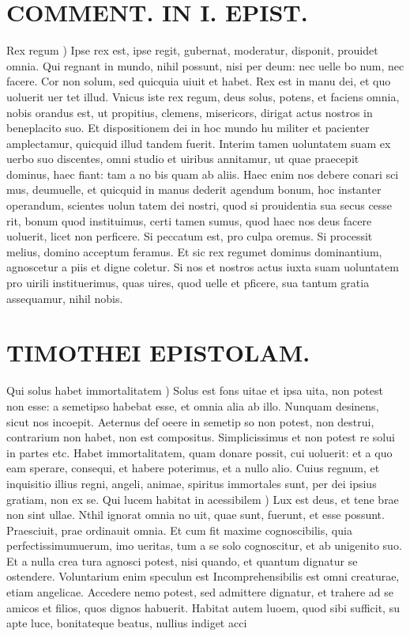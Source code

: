 \documentclass{article}
\begin{document}
\begin{pages}
\section*{COMMENT. IN I. EPIST. }
\marginpar{[ p.176 ]}\pstart Rex regum ) Ipse rex est, ipse regit, gubernat, moderatur, disponit, prouidet omnia. Qui regnant in mundo, nihil possunt, nisi per deum: nec uelle bo num, nec facere. Cor non solum, sed quicquia uiuit et habet. Rex est in manu dei, et quo uoluerit uer tet illud. Vnicus iste rex regum, deus solus, potens, et faciens omnia, nobis orandus est, ut propitius, clemens, misericors, dirigat actus nostros in beneplacito suo. Et dispositionem dei in hoc mundo hu militer et pacienter amplectamur, quicquid illud tandem fuerit. Interim tamen uoluntatem suam ex uerbo suo discentes, omni studio et uiribus annitamur, ut quae praecepit dominus, haec fiant: tam a no bis quam ab aliis. Haec enim nos debere conari sci mus, deumuelle, et quicquid in manus dederit agendum bonum, hoc instanter operandum, scientes uolun tatem dei nostri, quod si prouidentia sua secus cesse rit, bonum quod instituimus, certi tamen sumus, quod haec nos deus facere uoluerit, licet non perficere. Si peccatum est, pro culpa oremus. Si processit melius, domino acceptum feramus. Et sic rex regumet dominus dominantium, agnoscetur a piis et digne coletur. Si nos et nostros actus iuxta suam uoluntatem pro uirili instituerimus, quas uires, quod uelle et pficere, sua tantum gratia assequamur, nihil nobis.  \pend
\section*{TIMOTHEI EPISTOLAM. }
\marginpar{[ p.177 ]}\pstart Qui solus habet immortalitatem ) Solus est fons uitae et ipsa uita, non potest non esse: a semetipso habebat esse, et omnia alia ab illo. Nunquam desinens, sicut nos incoepit. Aeternus def oeere in semetip so non potest, non destrui, contrarium non habet, non est compositus. Simplicissimus et non potest re solui in partes etc. Habet immortalitatem, quam donare possit, cui uoluerit: et a quo eam sperare, consequi, et habere poterimus, et a nullo alio. Cuius regnum, et inquisitio illius regni, angeli, animae, spiritus immortales sunt, per dei ipsius gratiam, non ex se.  \pend\pstart Qui lucem habitat in acessibilem ) Lux est deus, et tene brae non sint ullae. Nthil ignorat omnia no uit, quae sunt, fuerunt, et esse possunt. Praesciuit, prae ordinauit omnia. Et cum fit maxime cognoscibilis, quia perfectissimumuerum, imo ueritas, tum a se solo cognoscitur, et ab unigenito suo. Et a nulla crea tura agnosci potest, nisi quando, et quantum dignatur se ostendere. Voluntarium enim speculun est Incomprehensibilis est omni creaturae, etiam angelicae. Accedere nemo potest, sed admittere dignatur, et trahere ad se amicos et filios, quos dignos habuerit. Habitat autem luoem, quod sibi sufficit, su apte luce, bonitateque beatus, nullius indiget acci\pend

\end{pages}
\end{document}
